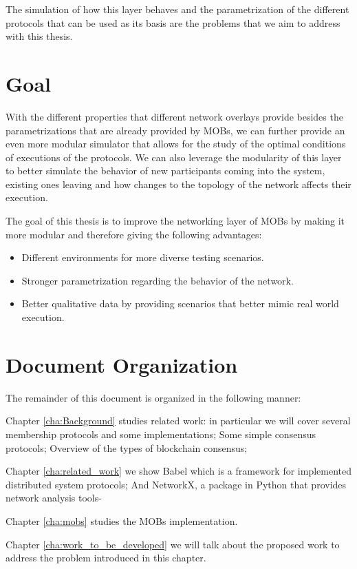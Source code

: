 The simulation of how this layer behaves and the parametrization of the different protocols that can be used as its basis are the
problems that we aim to address with this thesis.


\section{Goal}
\label{sub:goal}

With the different properties that different network overlays provide besides the parametrizations that are already provided by MOBs,
we can further provide an even more modular simulator that allows for the study of the optimal conditions of executions of the protocols.
We can also leverage the modularity of this layer to better simulate the behavior of new participants coming into the system, existing
ones leaving and how changes to the topology of the network affects their execution.

The goal of this thesis is to improve the networking layer of MOBs by making it more modular and therefore giving the following advantages:
\begin{itemize}
  \item Different environments for more diverse testing scenarios.
  \item Stronger parametrization regarding the behavior of the network.
  \item Better qualitative data by providing scenarios that better mimic real world execution.
\end{itemize}

\section{Document Organization}
\label{sub:document_organization}

The remainder of this document is organized in the following manner:

Chapter \ref{cha:Background} studies related work: in particular we will cover several membership protocols and some implementations;
Some simple consensus protocols; Overview of the types of blockchain consensus;


Chapter \ref{cha:related_work} we show Babel which is a framework for implemented distributed system protocols; And NetworkX,
a package in Python that provides network analysis tools-

Chapter \ref{cha:mobs} studies the MOBs implementation.

Chapter \ref{cha:work_to_be_developed} we will talk about the proposed work to address the problem
introduced in this chapter.